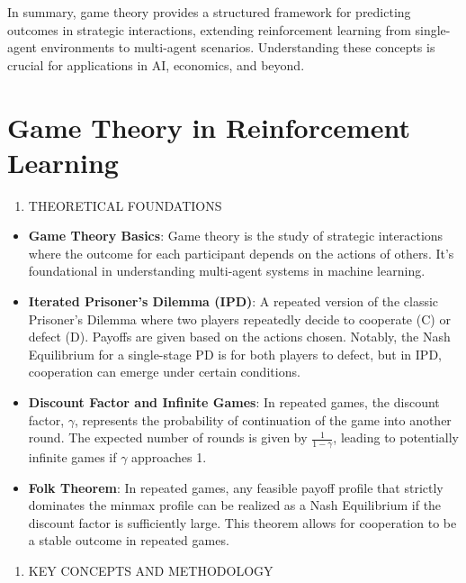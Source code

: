 \documentclass[
  12pt,
]{report}
\providecommand{\tightlist}{%
  \setlength{\itemsep}{0pt}\setlength{\parskip}{0pt}}
\begin{document}
In summary, game theory provides a structured framework for predicting outcomes in strategic interactions, extending reinforcement learning from single-agent environments to multi-agent scenarios. Understanding these concepts is crucial for applications in AI, economics, and beyond.

\chapter{Game Theory in Reinforcement Learning}

\begin{enumerate}
\def\labelenumi{\arabic{enumi}.}
\tightlist
\item
  THEORETICAL FOUNDATIONS
\end{enumerate}

\begin{itemize}
\item
  \textbf{Game Theory Basics}: Game theory is the study of strategic interactions where the outcome for each participant depends on the actions of others. It's foundational in understanding multi-agent systems in machine learning.
\item
  \textbf{Iterated Prisoner's Dilemma (IPD)}: A repeated version of the classic Prisoner's Dilemma where two players repeatedly decide to cooperate (C) or defect (D). Payoffs are given based on the actions chosen. Notably, the Nash Equilibrium for a single-stage PD is for both players to defect, but in IPD, cooperation can emerge under certain conditions.
\item
  \textbf{Discount Factor and Infinite Games}: In repeated games, the discount factor, \(\gamma\), represents the probability of continuation of the game into another round. The expected number of rounds is given by \(\frac{1}{1-\gamma}\), leading to potentially infinite games if \(\gamma\) approaches 1.
\item
  \textbf{Folk Theorem}: In repeated games, any feasible payoff profile that strictly dominates the minmax profile can be realized as a Nash Equilibrium if the discount factor is sufficiently large. This theorem allows for cooperation to be a stable outcome in repeated games.
\end{itemize}

\begin{enumerate}
\def\labelenumi{\arabic{enumi}.}
\setcounter{enumi}{1}
\tightlist
\item
  KEY CONCEPTS AND METHODOLOGY
\end{enumerate}
\end{document}
